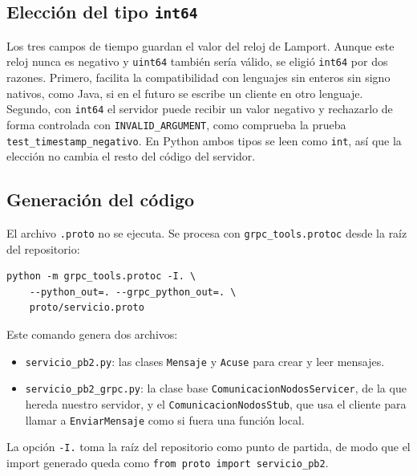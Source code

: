 \subsection{Elección del tipo \texttt{int64}}

Los tres campos de tiempo guardan el valor del reloj de Lamport. Aunque este
reloj nunca es negativo y \texttt{uint64} también sería válido, se eligió
\texttt{int64} por dos razones. Primero, facilita la compatibilidad con
lenguajes sin enteros sin signo nativos, como Java, si en el futuro se escribe
un cliente en otro lenguaje. Segundo, con \texttt{int64} el servidor puede
recibir un valor negativo y rechazarlo de forma controlada con
\texttt{INVALID\_ARGUMENT}, como comprueba la prueba
\texttt{test\_timestamp\_negativo}. En Python ambos tipos se leen como
\texttt{int}, así que la elección no cambia el resto del código del servidor.

\subsection{Generación del código}

El archivo \texttt{.proto} no se ejecuta. Se procesa con
\texttt{grpc\_tools.protoc} desde la raíz del repositorio:

\begin{verbatim}
python -m grpc_tools.protoc -I. \
    --python_out=. --grpc_python_out=. \
    proto/servicio.proto
\end{verbatim}

Este comando genera dos archivos:

\begin{itemize}
  \item \texttt{servicio\_pb2.py}: las clases \texttt{Mensaje} y
        \texttt{Acuse} para crear y leer mensajes.
  \item \texttt{servicio\_pb2\_grpc.py}: la clase base
        \texttt{ComunicacionNodosServicer}, de la que hereda nuestro servidor,
        y el \texttt{ComunicacionNodosStub}, que usa el cliente para llamar a
        \texttt{EnviarMensaje} como si fuera una función local.
\end{itemize}

La opción \texttt{-I.} toma la raíz del repositorio como punto de partida, de
modo que el import generado queda como \texttt{from proto import servicio\_pb2}.